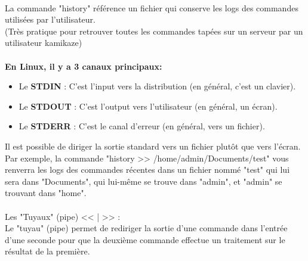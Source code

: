 \documentclass[12pt, a4paper]{article}
\begin{document}
\\
La commande "history" référence un fichier qui conserve les logs des commandes utilisées par l'utilisateur.\\
(Très pratique pour retrouver toutes les commandes tapées sur un serveur par un utilisateur kamikaze)\\
\\
\textbf{En Linux, il y a 3 canaux principaux:}
\begin{itemize}
  \setlength\itemsep{-0.4em}
\item Le \textbf{STDIN} : C'est l'input vers la distribution (en général, c'est un clavier).
\item Le \textbf{STDOUT} : C'est l'output vers l'utilisateur (en général, un écran).
\item Le \textbf{STDERR} : C'est le canal d'erreur (en général, vers un fichier).
\end{itemize}
Il est possible de diriger la sortie standard vers un fichier plutôt que vers l'écran.\\
Par exemple, la commande "history >> /home/admin/Documents/test" vous renverra les logs des commandes récentes dans un fichier nommé "test" qui lui sera dans "Documents", qui lui-même se trouve dans "admin", et "admin" se trouvant dans "home".\\
\\
Les "Tuyaux" (pipe) << | >> : \\
Le "tuyau" (pipe) permet de rediriger la sortie d'une commande dans l'entrée d'une seconde pour que la deuxième commande effectue un traitement sur le résultat de la première.\\
\newpage
\vspace*{1cm}
\end{document}

